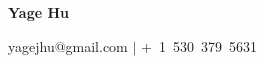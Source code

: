 \documentclass[12pt]{article}
\begin{document}
\begin{center}
    \LARGE
    \textbf{Yage Hu}\par
    \vspace{6pt}
    \small
    yagejhu@gmail.com $|$ +~1~530~379~5631\\
\end{center}




\end{document}
